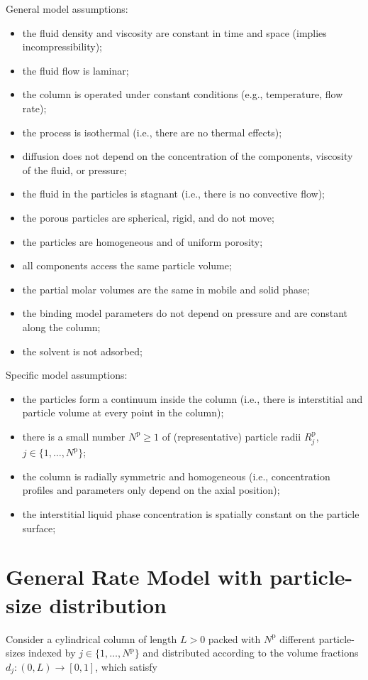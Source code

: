 \documentclass{article}
\begin{document}
General model assumptions:
\begin{itemize}
\item the fluid density and viscosity are constant in time and space (implies incompressibility);
\item the fluid flow is laminar;
\item the column is operated under constant conditions (e.g., temperature, flow rate);
\item the process is isothermal (i.e., there are no thermal effects);
\item diffusion does not depend on the concentration of the components, viscosity of the fluid, or pressure;
\item the fluid in the particles is stagnant (i.e., there is no convective flow);
\item the porous particles are spherical, rigid, and do not move;
\item the particles are homogeneous and of uniform porosity;
\item all components access the same particle volume;
\item the partial molar volumes are the same in mobile and solid phase;
\item the binding model parameters do not depend on pressure and are constant along the column;
\item the solvent is not adsorbed;
\end{itemize}


Specific model assumptions:
\begin{itemize}
\item the particles form a continuum inside the column (i.e., there is interstitial and particle volume at every point in the column);
\item there is a small number $N^{\mathrm{p}}\geq 1$ of (representative) particle radii $R^{\mathrm{p}}_{j}$, $j \in \{ 1, \dots, N^{\mathrm{p}} \}$;
\item the column is radially symmetric and homogeneous (i.e., concentration profiles and parameters only depend on the axial position);
\item the interstitial liquid phase concentration is spatially constant on the particle surface;
\end{itemize}


\section*{General Rate Model with particle-size distribution}
Consider a cylindrical column of length $L > 0$ packed with $N^{\mathrm{p}}$ different particle-sizes indexed by $j \in \{1, \dots, N^{\mathrm{p}}\}$ and distributed according to the volume fractions $d_j \colon (0, L) \to [0, 1]$, which satisfy
\end{document}
